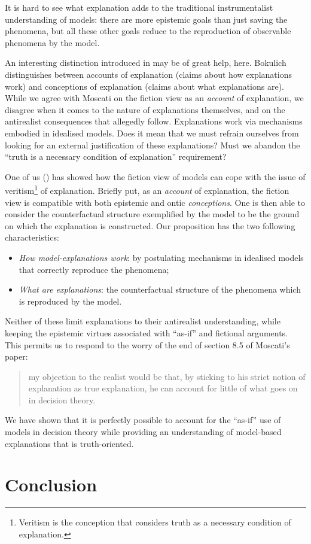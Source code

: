 \documentclass[a4paper,11pt]{article}
\theoremstyle{definition}
\begin{document}
It is hard to see what explanation adds to the traditional instrumentalist understanding of models: there are more epistemic goals than just saving the phenomena, but all these other goals reduce to the reproduction of observable phenomena by the model.

An interesting distinction introduced in \citep{Bokulich2018} may be of great help, here. Bokulich distinguishes between accounts of explanation (claims about how explanations work) and conceptions of explanation (claims about what explanations are). While we agree with Moscati on the fiction view as an \textit{account} of explanation, we disagree when it comes to the nature of explanations themselves, and on the antirealist consequences that allegedly follow. Explanations work via mechanisms embodied in idealised models. Does it mean that we must refrain ourselves from looking for an external justification of these explanations? Must we abandon the ``truth is a necessary condition of explanation'' requirement?

One of us (\citep{Brandelet2023}) has showed how the fiction view of models can cope with the issue of veritism\footnote{Veritism is the conception that considers truth as a necessary condition of explanation.} of explanation. Briefly put, as an \textit{account} of explanation, the fiction view is compatible with both epistemic and ontic \textit{conceptions}. One is then able to consider the counterfactual structure exemplified by the model to be the ground on which the explanation is constructed. Our proposition has the two following characteristics:

\begin{itemize}
    \item \textit{How model-explanations work}: by postulating mechanisms in idealised models that correctly reproduce the phenomena;
    \item \textit{What are explanations}: the counterfactual structure of the phenomena which is reproduced by the model.
\end{itemize}

Neither of these limit explanations to their antirealist understanding, while keeping the epistemic virtues associated with ``as-if'' and fictional arguments. This permits us to respond to the worry of the end of section 8.5 of Moscati's paper:

\begin{quote}
    my objection to the realist would be that, by sticking to his strict notion of explanation as true explanation, he can account for little of what goes on in decision theory. \citep[p.~22]{Moscati2023}
\end{quote}

We have shown that it is perfectly possible to account for the ``as-if'' use of models in decision theory while providing an understanding of model-based explanations that is truth-oriented.



\section{Conclusion}

 

\end{document}
